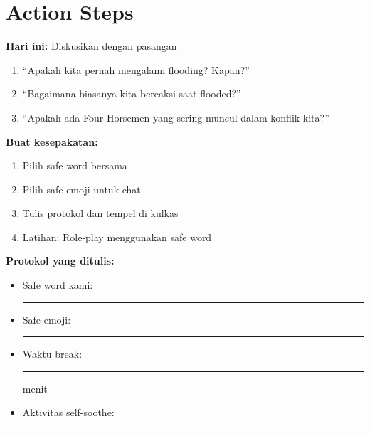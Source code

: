 \section{Action Steps}

\begin{exercisebox}
\textbf{Hari ini:} Diskusikan dengan pasangan
\begin{enumerate}
    \item ``Apakah kita pernah mengalami flooding? Kapan?''
    \item ``Bagaimana biasanya kita bereaksi saat flooded?''
    \item ``Apakah ada Four Horsemen yang sering muncul dalam konflik kita?''
\end{enumerate}

\textbf{Buat kesepakatan:}
\begin{enumerate}
    \item Pilih safe word bersama
    \item Pilih safe emoji untuk chat
    \item Tulis protokol dan tempel di kulkas
    \item Latihan: Role-play menggunakan safe word
\end{enumerate}

\textbf{Protokol yang ditulis:}
\begin{itemize}
    \item Safe word kami: \rule{5cm}{0.4pt}
    \item Safe emoji: \rule{3cm}{0.4pt}
    \item Waktu break: \rule{3cm}{0.4pt} menit
    \item Aktivitas self-soothe: \rule{8cm}{0.4pt}
\end{itemize}
\end{exercisebox}
